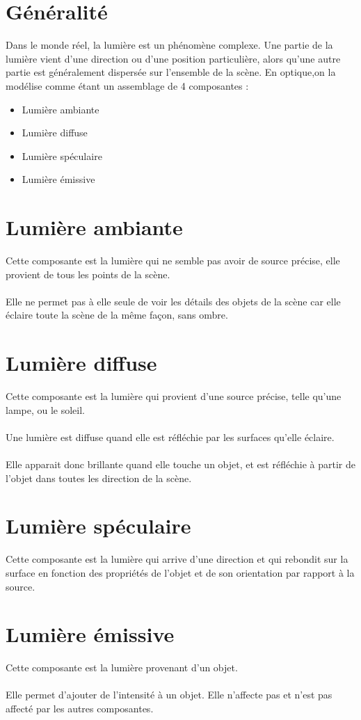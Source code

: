 \section{Généralité}
Dans le monde réel, la lumière est un phénomène complexe.
Une partie de la lumière vient d’une direction ou d’une position particulière, alors
qu’une autre partie est généralement dispersée sur l’ensemble de la scène. En optique,on la modélise comme étant un assemblage de 4 composantes :
\begin{itemize}
\item Lumière ambiante
\item Lumière diffuse
\item Lumière spéculaire
\item Lumière émissive
\end{itemize}

\section{Lumière ambiante}
Cette composante est la lumière qui ne semble pas avoir de source précise, elle provient de tous les points de la scène.
\\\\
Elle ne permet pas à elle seule de voir les détails des objets de la scène car elle éclaire toute la scène de la même façon, sans ombre.

\section{Lumière diffuse}
Cette composante est la lumière qui provient d'une source précise, telle qu'une lampe, ou le soleil.
\\\\
Une lumière est diffuse quand elle est réfléchie par les surfaces qu'elle éclaire.
\\\\
Elle apparait donc brillante quand elle touche un objet, et est réfléchie à partir de l'objet dans toutes les direction de la scène.

\section{Lumière spéculaire}
Cette composante est la lumière qui arrive d'une direction et qui rebondit sur la surface en fonction des propriétés de l'objet et de son orientation par rapport à la source.

\section{Lumière émissive}
Cette composante est la lumière provenant d'un objet.
\\\\
Elle permet d'ajouter de l'intensité à un objet.
Elle n'affecte pas et n'est pas affecté par les autres composantes.